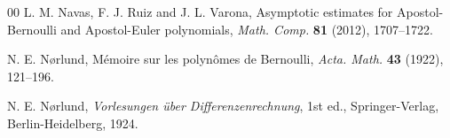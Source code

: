 \documentclass[11pt,a4paper]{amsart}
\theoremstyle{plain}
\theoremstyle{plain}
\theoremstyle{definition}
\theoremstyle{remark}
\begin{document}
\begin{thebibliography}{00}
L. M. Navas, F. J. Ruiz and J. L. Varona,
Asymptotic estimates for Apostol-Bernoulli and Apostol-Euler polynomials,
\textit{Math. Comp.}
\textbf{81} (2012), 1707--1722.


N. E. N{\o}rlund, %
M\'emoire sur les polyn\^omes de Bernoulli,
\textit{Acta. Math.} 
\textbf{43} (1922), 121--196.

N. E. N{\o}rlund, %
\textit{Vorlesungen \"uber Differenzenrechnung}, 1st ed., 
Springer-Verlag, Berlin-Heidelberg, 1924.



\end{thebibliography}


\end{document}
